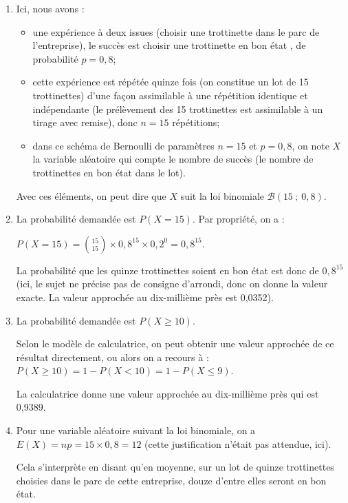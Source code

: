 	\begin{enumerate}
		\item 	Ici, nous avons :
		\begin{itemize}
			\item une expérience à deux issues (choisir une trottinette dans le parc de l'entreprise), le succès est \og choisir une trottinette en bon état \fg{}, de probabilité $p = 0,8$;
			\item cette expérience est répétée quinze fois (on constitue un lot de 15 trottinettes) d'une façon assimilable à une répétition identique et indépendante (le prélèvement des 15 trottinettes est assimilable à un tirage avec remise), donc $n=15$ répétitions;
			\item dans ce schéma de Bernoulli de paramètres $n=15$ et $p=0,8$, on note $X$ la variable aléatoire qui compte le nombre de succès (le nombre de trottinettes en bon état dans le lot).
		\end{itemize}
Avec ces éléments, on peut dire que $X$ suit la loi binomiale $ \mathcal{B}\left(15 ~;~ 0,8\right) $.

	\item La probabilité demandée est $P(X = 15)$. Par propriété, on a :

$\displaystyle P(X=15) = \binom{15}{15} \times 0,8^{15} \times 0,2^0 = 0,8^{15}$.

La probabilité que les quinze trottinettes soient en bon état est donc de $0,8^{15}$ (ici, le sujet ne précise pas de consigne d'arrondi, donc on donne la valeur exacte. La valeur approchée au dix-millième près est 0,0352).

	\item La probabilité demandée est $P(X \geqslant 10)$.

Selon le modèle de calculatrice, on peut obtenir une valeur approchée de ce résultat directement, ou alors on a recours à : $P(X \geqslant 10) = 1 - P(X <10) = 1 - P(X \leqslant 9)$.

La calculatrice donne une valeur approchée au dix-millième près qui est 0,9389.

	\item Pour une variable aléatoire suivant la loi binomiale, on a $E(X) = np = 15 \times 0,8 = 12$ (cette justification n'était pas attendue, ici).

Cela s'interprète en disant qu'en moyenne, sur un lot de quinze trottinettes choisies dans le parc de cette entreprise, douze d'entre elles seront en bon état.
\end{enumerate}

\bigskip
